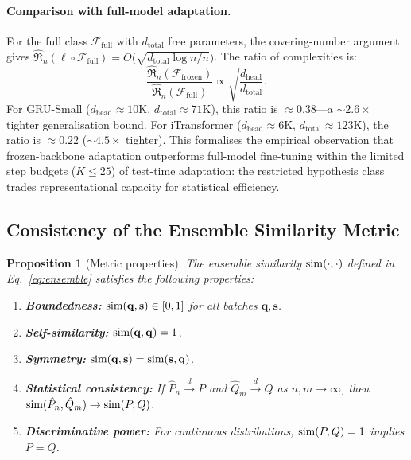 \documentclass[11pt,a4paper]{article}
\newtheorem{proposition}{Proposition}
\begin{document}
\paragraph{Comparison with full-model adaptation.} For the full class $\mathcal{F}_{\text{full}}$ with $d_{\text{total}}$ free parameters, the covering-number argument gives $\hat{\mathfrak{R}}_n(\ell \circ \mathcal{F}_{\text{full}}) = O\big(\sqrt{d_{\text{total}} \log n / n}\big)$. The ratio of complexities is:
\begin{equation}
    \frac{\hat{\mathfrak{R}}_n(\mathcal{F}_{\text{frozen}})}{\hat{\mathfrak{R}}_n(\mathcal{F}_{\text{full}})} \propto \sqrt{\frac{d_{\text{head}}}{d_{\text{total}}}}.
    \label{eq:complexity_ratio}
\end{equation}
For GRU-Small ($d_{\text{head}} \approx 10$K, $d_{\text{total}} \approx 71$K), this ratio is $\approx 0.38$---a ${\sim}2.6\times$ tighter generalisation bound. For iTransformer ($d_{\text{head}} \approx 6$K, $d_{\text{total}} \approx 123$K), the ratio is $\approx 0.22$ (${\sim}4.5\times$ tighter). This formalises the empirical observation that frozen-backbone adaptation outperforms full-model fine-tuning within the limited step budgets ($K \leq 25$) of test-time adaptation: the restricted hypothesis class trades representational capacity for statistical efficiency.

\subsection{Consistency of the Ensemble Similarity Metric}
\label{sec:theory_metric}

\begin{proposition}[Metric properties]
\label{prop:metric}
The ensemble similarity $\textup{sim}(\cdot, \cdot)$ defined in Eq.~\ref{eq:ensemble} satisfies the following properties:
\begin{enumerate}[nosep]
    \item \textbf{Boundedness:} $\textup{sim}(\mathbf{q}, \mathbf{s}) \in [0, 1]$ for all batches $\mathbf{q}, \mathbf{s}$.
    \item \textbf{Self-similarity:} $\textup{sim}(\mathbf{q}, \mathbf{q}) = 1$.
    \item \textbf{Symmetry:} $\textup{sim}(\mathbf{q}, \mathbf{s}) = \textup{sim}(\mathbf{s}, \mathbf{q})$.
    \item \textbf{Statistical consistency:} If $\hat{P}_n \xrightarrow{d} P$ and $\hat{Q}_m \xrightarrow{d} Q$ as $n, m \to \infty$, then $\textup{sim}(\hat{P}_n, \hat{Q}_m) \to \textup{sim}(P, Q)$.
    \item \textbf{Discriminative power:} For continuous distributions, $\textup{sim}(P, Q) = 1$ implies $P = Q$.
\end{enumerate}
\end{proposition}
\end{document}
